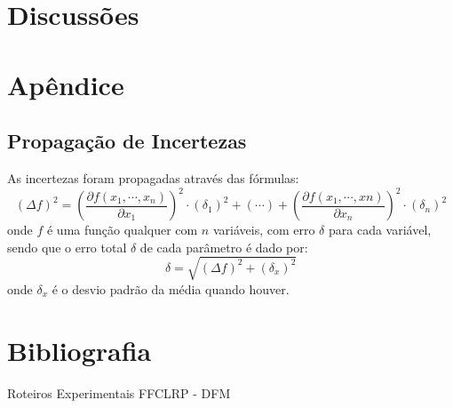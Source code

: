 \documentclass[a4paper, 12pt]{article}
\begin{document}
\newpage

\section{Discussões}


\newpage

\section*{Apêndice}

\subsection*{Propagação de Incertezas}

As \hypertarget{PROPAGAÇÃO}{incertezas} foram propagadas através das fórmulas:
\begin{equation}
    (\Delta f)^2 = \left( \frac{\partial f(x_1,\cdots,x_n)}{\partial x_1} \right)^2 \cdot (\delta_1)^2 + (\cdots) + \left( \frac{\partial f(x_1,\cdots,xn)}{\partial x_n} \right)^2 \cdot (\delta_n)^2
    \label{propagacao}
\end{equation}
onde $f$ é uma função qualquer com $n$ variáveis, com erro $\delta$ para cada variável, sendo que o erro total $\delta$ de cada parâmetro é dado por:
\begin{equation}
    \delta = \sqrt{(\Delta f)^2 + (\delta_x)^2}
    \label{erro}
\end{equation}
 onde $\delta_x$ é o desvio padrão da média quando houver.

\section*{Bibliografia}
\footnotesize{

\noindent Roteiros Experimentais FFCLRP - DFM

}
\end{document}
